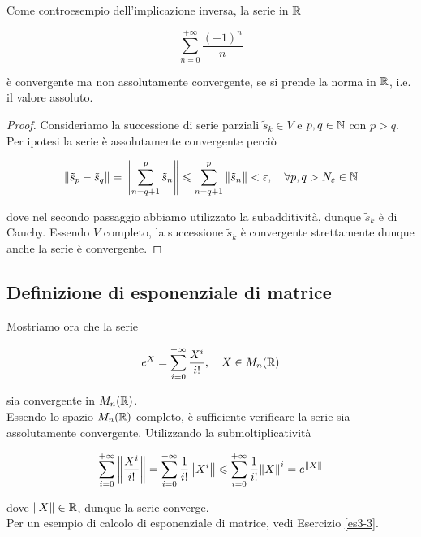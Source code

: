 Come controesempio dell'implicazione inversa, la serie in $ \mathbb{R} $

\begin{equation}
	\sum_{n=0}^{+\infty} \dfrac{(-1)^{n}}{n}
\end{equation}

è convergente ma non assolutamente convergente, se si prende la norma in $ \mathbb{R} $, i.e. il valore assoluto.

\begin{proof}
	Consideriamo la successione di serie parziali $ \tilde{s}_{k} \in V $ e $ p,q \in \mathbb{N} $ con $ p > q $. Per ipotesi la serie è assolutamente convergente perciò
	
	\begin{equation}
		\norm{\tilde{s}_{p} - \tilde{s}_{q}} = \norm{ \sum_{n=q+1}^{p} \tilde{s}_{n} } \leqslant \sum_{n=q+1}^{p} \norm{\tilde{s}_{n}} < \varepsilon %
		\qcomma \forall p,q > N_{\varepsilon} \in \N
	\end{equation}

	dove nel secondo passaggio abbiamo utilizzato la subadditività, dunque $ \tilde{s}_{k} $ è di Cauchy. Essendo $ V $ completo, la successione $ \tilde{s}_{k} $ è convergente strettamente dunque anche la serie è convergente.
\end{proof}

\subsection{Definizione di esponenziale di matrice}

Mostriamo ora che la serie

\begin{equation}
	e^{X} = \sum_{i=0}^{+\infty} \dfrac{X^{i}}{i!} \qcomma X \in M_{n}(\R)
\end{equation}

sia convergente in $ M_{n}(\mathbb{R}) $.\\
Essendo lo spazio $ M_{n}(\mathbb{R}) $ completo, è sufficiente verificare la serie sia assolutamente convergente. Utilizzando la submoltiplicatività

\begin{equation}
	\sum_{i=0}^{+\infty} \norm{ \dfrac{X^{i}}{i!} } = %
	\sum_{i=0}^{+\infty} \dfrac{1}{i!} \norm{X^{i}} \leqslant %
	\sum_{i=0}^{+\infty} \dfrac{1}{i!} \norm{X}^{i} = %
	e^{\norm{X}}
\end{equation}

dove $ \norm{X} \in \mathbb{R} $, dunque la serie converge.\\
Per un esempio di calcolo di esponenziale di matrice, vedi Esercizio \ref{es3-3}.

